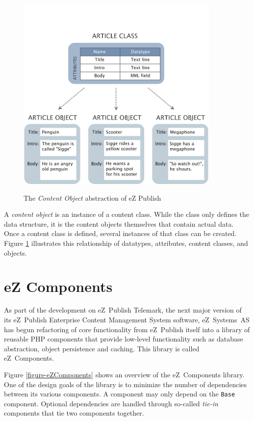 \begin{figure}[hbt]
\begin{center}
\includegraphics[width=10cm]{figures/ContentObject}\\[5mm]
\end{center}
\caption{The \emph{Content Object} abstraction of eZ Publish}
\label{figure-ContentObject}
\end{figure}

A \emph{content object} is an instance of a content class. While the class
only defines the data structure, it is the content objects themselves that
contain actual data. Once a content class is defined, several instances of
that class can be created. Figure \ref{figure-ContentObject} illustrates
this relationship of datatypes, attributes, content classes, and objects.

\section{eZ Components}
\label{section-eZComponents}

As part of the development on eZ~Publish Telemark, the next major version
of its eZ~Publish Enterprise Content Management System software, eZ~Systems~AS
has begun refactoring of core functionality from eZ~Publish itself into a
library of reusable PHP components that provide low-level functionality such
as database abstraction, object persistence and caching. This library is
called eZ~Components.

Figure \ref{figure-eZComponents} shows an overview of the eZ~Components
library. One of the design goals of the library is to minimize the number of
dependencies between its various components. A component may only depend on
the \texttt{Base} component. Optional dependencies are handled through
so-called \emph{tie-in} components that tie two components together.

